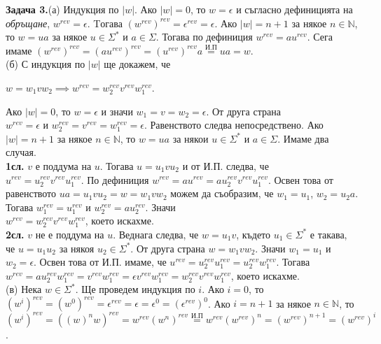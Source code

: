 \documentclass[openany]{book}
\begin{document}
   \vspace{15pt}

   \textbf{Задача 3.}(а) Индукция по $|w|$. Ако $|w| = 0$, то $w = \epsilon$ и съгласно дефиницията на \textit{обръщане}, $w^{rev} = \epsilon$. Tогава 
   $(w^{rev})^{rev} = \epsilon^{rev} = \epsilon$. Ако $|w| = n + 1$ за някое $n \in \mathbb{N}$, то $w = ua$ за някое $u \in \Sigma^*$ и $a \in \Sigma$.
   Тогава по дефиниция $w^{rev} = au^{rev}$. Сега имаме $(w^{rev})^{rev} = (au^{rev})^{rev} = (u^{rev})^{rev}a \stackrel{\text{И.П}}{=} ua = w$. \\
   (б) С индукция по $|w|$ ще докажем, че
   \begin{center}
        $w = w_1vw_2 \implies w^{rev} = w_2^{rev}v^{rev}w_1^{rev}$.
   \end{center}
   Ако $|w| = 0$, то $w = \epsilon$ и значи $w_1 = v = w_2 = \epsilon$. От друга страна \\ $w^{rev} = \epsilon$ и $w_2^{rev} = v^{rev} = w_1^{rev} = \epsilon$.
   Равенството следва непосредствено. Ако $|w| = n + 1$ за някое $n \in \mathbb{N}$, то $w = ua$ за някои $u \in \Sigma^*$ и $a \in \Sigma$. Имаме два случая. \\
   \textbf{1сл.} $v$ е поддума на $u$. Тогава $u = u_1vu_2$ и от И.П. следва, че \\ $u^{rev} = u_2^{rev}v^{rev}u_1^{rev}$. По дефиниция $w^{rev} = au^{rev} = 
   au_2^{rev}v^{rev}u_1^{rev}$. Освен това от равенството $ua = u_1vu_2 = w = w_1vw_2$ можем да съобразим, че $w_1 = u_1$, $w_2 = u_2a$. Тогава
   $w_1^{rev} = u_1^{rev}$ и $w_2^{rev} = au_2^{rev}$. Значи \\ $w^{rev} = w_2^{rev}v^{rev}w_1^{rev}$, което искахме. \\
   \textbf{2сл.} $v$ не е поддума на $u$. Веднага следва, че $w = u_1v$, където $u_1 \in \Sigma^*$ е такава, че $u = u_1u_2$ за някоя $u_2 \in \Sigma^*$.
   От друга страна $w = w_1vw_2$. Значи $w_1 = u_1$ и $w_2 = \epsilon$. Освен това от И.П. имаме, че $u^{rev} = u_2^{rev}u_1^{rev} = u_2^{rev}w_1^{rev}$. 
   Тогава $w^{rev} = au_2^{rev}w_1^{rev} = v^{rev}w_1^{rev} = \epsilon v^{rev}w_1^{rev} = w_2^{rev}v^{rev}w_1^{rev}$, което искахме. \\
   (в) Нека $w \in \Sigma^*$. Ще проведем индукция по $i$. Ако $i = 0$, то $(w^i)^{rev} = (w^0)^{rev} = \epsilon^{rev} = \epsilon = \epsilon^0 = (\epsilon^{rev})^0$. 
   Ако $i = n + 1$ за някое $n \in \mathbb{N}$, то $(w^i)^{rev} = ((w)^nw)^{rev} = w^{rev}(w^n)^{rev} \stackrel{\text{И.П}}{=} w^{rev}(w^{rev})^n = (w^{rev})^{n+1} = (w^{rev})^i$.
\end{document}
